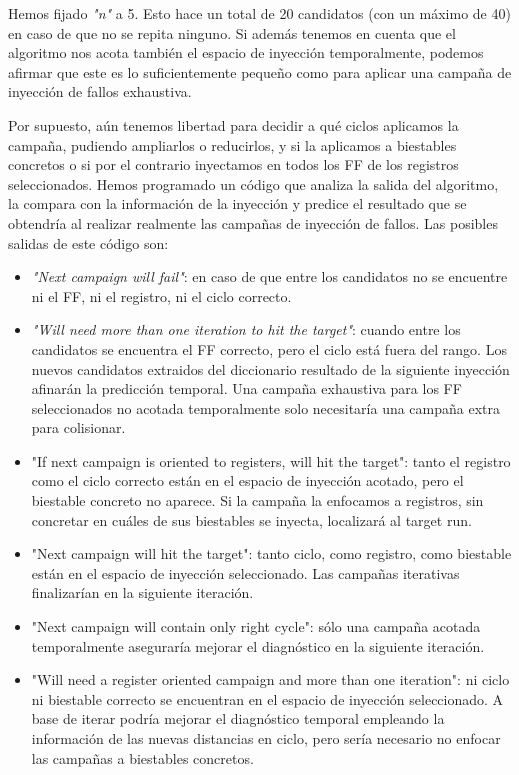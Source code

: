 Hemos fijado \textit{"n"} a 5. Esto hace un total de 20 candidatos (con un máximo
de 40) en caso de que no se repita ninguno. Si además tenemos en cuenta que el
algoritmo nos acota también el espacio de inyección temporalmente, podemos afirmar
que este es lo suficientemente pequeño como para aplicar una campaña de inyección
de fallos exhaustiva.

Por supuesto, aún tenemos libertad para decidir a qué ciclos aplicamos la campaña,
pudiendo ampliarlos o reducirlos, y si la aplicamos a biestables concretos o si 
por el contrario inyectamos en todos los \gls{FF} de los registros
seleccionados. Hemos programado un código que analiza la salida del algoritmo, la
compara con la información de la inyección y predice el resultado que se obtendría
al realizar realmente las campañas de inyección de fallos. Las posibles salidas de
este código son:
\begin{itemize}
    \item \textit{"Next campaign will fail"}: en caso de que entre los candidatos 
        no se encuentre ni el \gls{FF}, ni el registro, ni el ciclo correcto.
    \item \textit{"Will need more than one iteration to hit the target"}: cuando
        entre los candidatos se encuentra el \gls{FF} correcto, pero el ciclo está
        fuera del rango. Los nuevos candidatos extraidos del diccionario resultado
        de la siguiente inyección afinarán la predicción temporal. Una campaña
        exhaustiva para los \gls{FF} seleccionados no acotada temporalmente solo
        necesitaría una campaña extra para colisionar.
    \item "If next campaign is oriented to registers, will hit the target": tanto
        el registro como el ciclo correcto están en el espacio de inyección
        acotado, pero el biestable concreto no aparece. Si la campaña la enfocamos
        a registros, sin concretar en cuáles de sus biestables se inyecta,
        localizará al target run.
    \item "Next campaign will hit the target": tanto ciclo, como registro, como
        biestable están en el espacio de inyección seleccionado. Las campañas
        iterativas finalizarían en la siguiente iteración.
    \item "Next campaign will contain only right cycle": sólo una campaña acotada
        temporalmente aseguraría mejorar el diagnóstico en la siguiente iteración.
    \item "Will need a register oriented campaign and more than one iteration": ni
        ciclo ni biestable correcto se encuentran en el espacio de inyección
        seleccionado. A base de iterar podría mejorar el diagnóstico temporal
        empleando la información de las nuevas distancias en ciclo, pero sería
        necesario no enfocar las campañas a biestables concretos.
\end{itemize}

